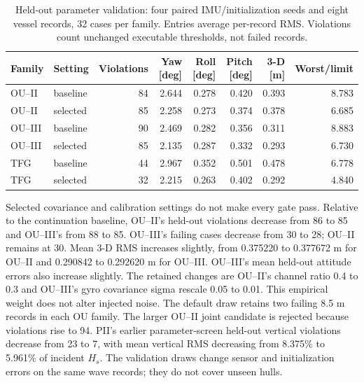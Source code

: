 \begin{table}[t]\centering\footnotesize
\caption{Held-out parameter validation: four paired IMU/initialization seeds and eight
vessel records, 32 cases per family. Entries average per-record RMS.
Violations count unchanged executable thresholds, not failed records.}
\label{tab:rao-parameter-validation}
\begin{tabular}{@{}llrrrrrr@{}}\toprule
Family & Setting & Violations & Yaw [deg] & Roll [deg] & Pitch [deg] & 3-D [m] & Worst/limit \\
\midrule
OU--II & baseline & 84 & 2.644 & 0.278 & 0.420 & 0.393 & 8.783 \\
OU--II & selected & 85 & 2.258 & 0.273 & 0.374 & 0.378 & 6.685 \\
OU--III & baseline & 90 & 2.469 & 0.282 & 0.356 & 0.311 & 8.883 \\
OU--III & selected & 85 & 2.135 & 0.287 & 0.332 & 0.293 & 6.730 \\
TFG & baseline & 44 & 2.967 & 0.352 & 0.501 & 0.478 & 6.778 \\
TFG & selected & 32 & 2.215 & 0.263 & 0.402 & 0.292 & 4.840 \\
\bottomrule\end{tabular}\end{table}
Selected covariance and calibration settings do not make every gate pass.
Relative to the continuation baseline, OU--II's held-out violations decrease
from 86 to 85 and OU--III's from 88 to 85. OU--III's failing cases decrease
from 30 to 28; OU--II remains at 30. Mean 3-D RMS increases slightly, from
0.375220 to 0.377672 m for OU--II and 0.290842 to 0.292620 m for OU--III.
OU--III's mean held-out attitude errors also increase slightly. The retained
changes are OU--II's channel ratio 0.4 to 0.3 and OU--III's gyro covariance
sigma rescale 0.05 to 0.01. This empirical weight does not alter injected noise.
The default draw retains two failing 8.5 m records in each OU family.
The larger OU--II joint candidate is rejected because violations rise to 94.
PII's earlier parameter-screen held-out vertical
violations decrease from 23 to 7, with mean vertical RMS decreasing from
8.375\% to 5.961\% of incident $H_s$. The validation draws change sensor and
initialization errors on the same wave records; they do not cover unseen hulls.
